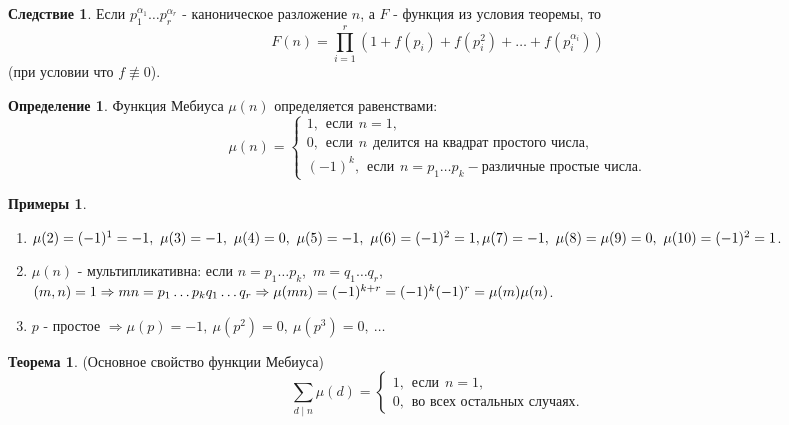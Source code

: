 \documentclass[a4paper, 12pt]{article}
\renewcommand{\div}{\mid}
\newcommand\tab[1][.5cm]{\hspace*{#1}}
\theoremstyle{definition}
\newtheorem{definition}{Определение}[section]
\newtheorem{theorem}{Теорема}[section]
\newtheorem*{consequense}{Следствие}
\newtheorem*{examples}{Примеры}
\begin{document}
    \begin{consequense}
        Если $p_1^{\alpha_1}\dots p_r^{\alpha_r}$ - каноническое разложение $n$, а $F$ - функция из условия теоремы, то
        $$F(n)=\prod\limits_{i=1}^{r}(1+f(p_i)+f(p_i^2)+\dots +f(p_i^{\alpha_i}))$$
        (при условии что $f\not\equiv 0$).
    \end{consequense}
    \begin{definition}
        Функция Мебиуса $\mu(n)$ определяется равенствами:
        \[\mu(n)=\begin{cases}
            1, \hspace{5pt} \text{если} \hspace{5pt} n=1,\\
            0, \hspace{5pt} \text{если} \hspace{5pt} n \hspace{5pt} \text{делится на квадрат простого числа},\\
            (-1)^k,\hspace{5pt} \text{если} \hspace{5pt} n=p_1\dots p_k - \text{различные простые числа}.
        \end{cases}\]
    \end{definition} 
    \begin{examples}\tab
        \begin{enumerate}
            \item $\mu(2)=(-1)^1=-1,\ \mu(3)=-1,\ \mu(4)=0,\ \mu(5)=-1,\ \mu(6)=(-1)^2=1,\\
            \mu(7)=-1,\ \mu(8)=\mu(9)=0,\ \mu(10)=(-1)^2=1$.
            \item $\mu(n)$ - мультипликативна: если $n=p_1\dots p_k$,\ $m=q_1\dots q_r$,\ $(m,n)=1\\
            \Rightarrow mn=p_1\dots p_kq_1\dots q_r \Rightarrow \mu(mn)=(-1)^{k+r}=(-1)^k(-1)^r=\mu(m)\mu(n)$.
            \item $p$ - простое $\Rightarrow \mu(p)=-1,\ \mu(p^2)=0,\ \mu(p^3)=0,\ \dots$
        \end{enumerate}
    \end{examples}
    \begin{theorem}
        (Основное свойство функции Мебиуса) \label{th6.3}
        \[\sum\limits_{d\div n}\mu(d)=\begin{cases}
            1, \hspace{5pt} \text{если} \hspace{5pt} n=1,\\
            0, \hspace{5pt} \text{во всех остальных случаях}.
        \end{cases}\]
    \end{theorem} 
\end{document}
